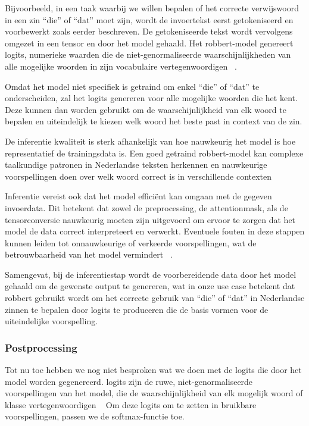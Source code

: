 Bijvoorbeeld, in een taak waarbij we willen bepalen of het correcte verwijswoord in een zin ``die'' of ``dat'' moet zijn, wordt de invoertekst eerst getokeniseerd en voorbewerkt zoals eerder beschreven. De getokeniseerde tekst wordt vervolgens omgezet in een \gls{tensor} en door het model gehaald. Het \gls{robbert}-model genereert \glspl{logit}, numerieke waarden die de niet-genormaliseerde waarschijnlijkheden van alle mogelijke woorden in zijn vocabulaire vertegenwoordigen ~\autocite{Google2024}.

Omdat het model niet specifiek is getraind om enkel ``die'' of ``dat'' te onderscheiden, zal het \glspl{logit} genereren voor alle mogelijke woorden die het kent. Deze kunnen dan worden gebruikt om de waarschijnlijkheid van elk woord te bepalen en uiteindelijk te kiezen welk woord het beste past in context van de zin.

De inferentie kwaliteit is sterk afhankelijk van hoe nauwkeurig het model is hoe representatief de trainingsdata is. Een goed getraind \gls{robbert}-model kan complexe taalkundige patronen in Nederlandse teksten herkennen en nauwkeurige voorspellingen doen over welk woord correct is in verschillende contexten ~\autocite{Delobelle2020}

Inferentie vereist ook dat het model efficiënt kan omgaan met de gegeven invoerdata. Dit betekent dat zowel de preprocessing, de \gls{attentionmask}, als de tensorconversie nauwkeurig moeten zijn uitgevoerd om ervoor te zorgen dat het model de data correct interpreteert en verwerkt. Eventuele fouten in deze stappen kunnen leiden tot onnauwkeurige of verkeerde voorspellingen, wat de betrouwbaarheid van het model vermindert ~\autocite{Jain2020}.

Samengevat, bij de inferentiestap wordt de voorbereidende data door het model gehaald om de gewenste output te genereren, wat in onze use case betekent dat \gls{robbert} gebruikt wordt om het correcte gebruik van ``die'' of ``dat'' in Nederlandse zinnen te bepalen door \glspl{logit} te produceren die de basis vormen voor de uiteindelijke voorspelling.

\subsubsection{Postprocessing}

Tot nu toe hebben we nog niet besproken wat we doen met de \glspl{logit} die door het model worden gegenereerd. \Glspl{logit} zijn de ruwe, niet-genormaliseerde voorspellingen van het model, die de waarschijnlijkheid van elk mogelijk woord of klasse vertegenwoordigen ~\autocite{Google2024} Om deze \glspl{logit} om te zetten in bruikbare voorspellingen, passen we de \gls{softmax}-functie toe.

